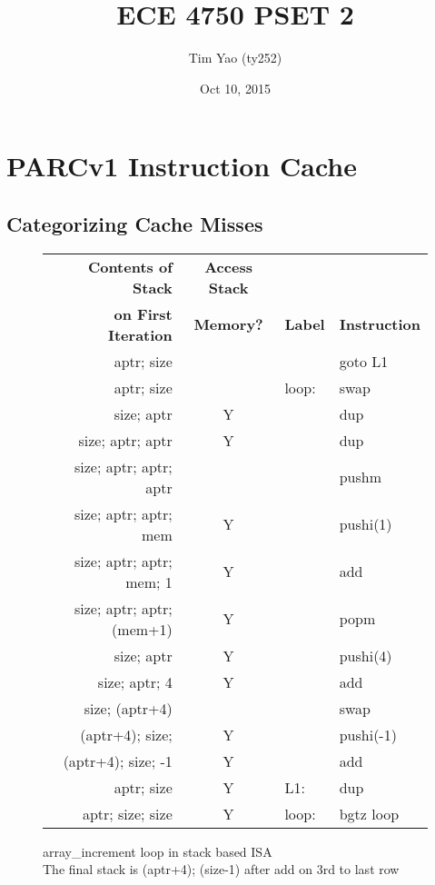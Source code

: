 \documentclass[10pt]{article}
\title{ECE 4750 PSET 2}
\author{Tim Yao (ty252)}
\date{Oct 10, 2015}
\begin{document}
\maketitle

\section{PARCv1 Instruction Cache} 
\subsection{Categorizing Cache Misses}
\begin{figure}[H]
\centering
\begin{tabular}{rcll}
\hline
\textbf{Contents of Stack}  &  \textbf{Access Stack}\\
\textbf{on First Iteration} &  \textbf{Memory?} & \textbf{Label} & \textbf{Instruction} \\
\hline
aptr; size & & & goto L1\\
aptr; size & & loop: & swap\\
size; aptr & Y & & dup\\
size; aptr; aptr & Y & & dup\\
size; aptr; aptr; aptr  & & & pushm\\
size; aptr; aptr; mem & Y & & pushi(1)\\
size; aptr; aptr; mem; 1 & Y & & add\\
size; aptr; aptr; (mem+1) & Y & & popm\\
size; aptr & Y & & pushi(4)\\
size; aptr; 4 & Y & & add\\
size; (aptr+4) & & & swap\\
(aptr+4); size; & Y & & pushi(-1)\\
(aptr+4); size; -1 & Y & & add\\
aptr; size & Y & L1: & dup\\
aptr; size; size & Y & loop: & bgtz loop\\
\hline
\end{tabular}
\caption{array\_increment loop in stack based ISA
\\The final stack is (aptr+4); (size-1) after add on 3rd to last row}
\end{figure}
\end{document}
